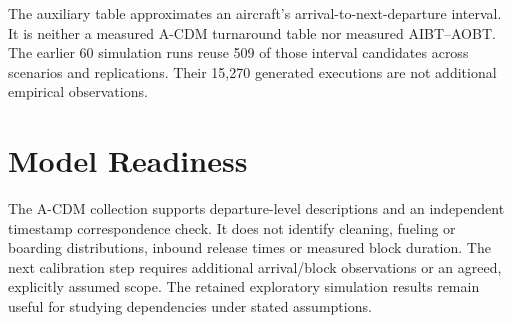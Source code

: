 The auxiliary table approximates an aircraft's arrival-to-next-departure interval. It is neither a measured A-CDM turnaround table nor measured AIBT--AOBT. The earlier 60 simulation runs reuse 509 of those interval candidates across scenarios and replications. Their 15,270 generated executions are not additional empirical observations.

\section{Model Readiness}
The A-CDM collection supports departure-level descriptions and an independent timestamp correspondence check. It does not identify cleaning, fueling or boarding distributions, inbound release times or measured block duration. The next calibration step requires additional arrival/block observations or an agreed, explicitly assumed scope. The retained exploratory simulation results remain useful for studying dependencies under stated assumptions.
